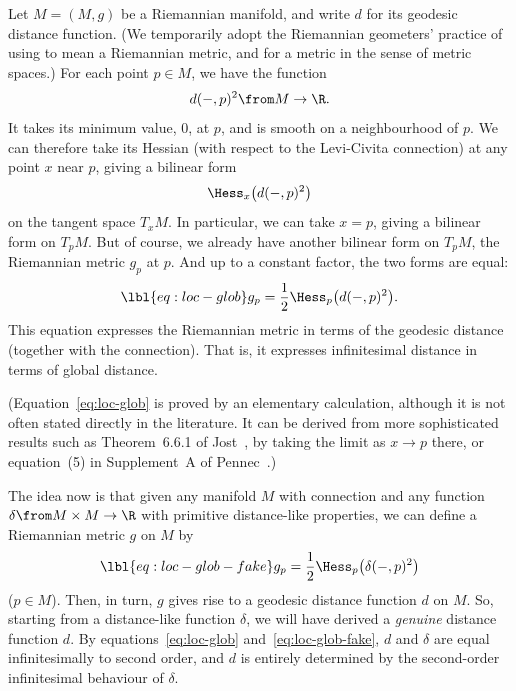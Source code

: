 Let $M = (M, g)$ be a Riemannian%
%
% 
manifold, and write $d$ for its geodesic distance function.  (We
temporarily adopt the Riemannian geometers' practice of using 
to mean a Riemannian metric, and  for a metric in the sense
of metric spaces.)  For each point $p \in M$, we have the function
\[
d(-, p)^2 \from M \to \R.
\]
It takes its minimum value, $0$, at $p$, and is smooth on a neighbourhood
of $p$.  We can therefore take its Hessian (with respect to
the Levi-Civita connection) at any point $x$ near $p$, giving a bilinear
form
\[
\Hess_x \bigl( d(-, p)^2 \bigr)
\]
on the tangent space $T_x M$.  In particular, we can take $x = p$, giving a
bilinear form on $T_p M$.  But of course, we already have another bilinear
form on $T_p M$, the Riemannian metric $g_p$ at $p$.  And up to a
constant factor, the two forms are equal:
% 
\begin{equation}
\lbl{eq:loc-glob}
g_p
=
\frac{1}{2}
\Hess_p \bigl( d(-, p)^2 \bigr).
\end{equation}
% 
This equation expresses the Riemannian
metric in terms of the geodesic distance (together with the connection).
That is, it expresses infinitesimal distance in terms of global distance.

(Equation~\eqref{eq:loc-glob} is proved by an elementary calculation,
although it is not often stated directly in the literature.  It can be derived
from more sophisticated results such as Theorem~6.6.1 of
Jost~\cite{JostRGG}, by taking the limit as $x \to p$ there, or
equation~(5) in Supplement~A of Pennec~\cite{PennBSA}.)

The idea now is that given any manifold $M$ with connection and any
function $\delta \from M \times M \to \R$ with primitive distance-like
properties, we can define a Riemannian metric $g$ on $M$ by
% 
\begin{equation}
\lbl{eq:loc-glob-fake}
g_p
=
\frac{1}{2}
\Hess_p \bigl( \delta(-, p)^2 \bigr)
\end{equation}
% 
($p \in M$).  Then, in turn, $g$ gives rise to a geodesic distance function
$d$ on $M$.  So, starting from a distance-like function $\delta$, we will
have derived a \emph{genuine} distance function $d$.  By
equations~\eqref{eq:loc-glob} and~\eqref{eq:loc-glob-fake}, $d$ and
$\delta$ are equal infinitesimally to second order, and $d$ is
entirely determined by the second-order infinitesimal behaviour of
$\delta$.

